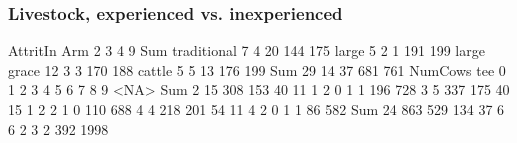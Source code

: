 \subsubsection{Livestock, experienced vs. inexperienced}


\begin{Schunk}
\begin{Soutput}
             AttritIn
Arm             2   3   4   9 Sum
  traditional   7   4  20 144 175
  large         5   2   1 191 199
  large grace  12   3   3 170 188
  cattle        5   5  13 176 199
  Sum          29  14  37 681 761
     NumCows
tee      0    1    2    3    4    5    6    7    8    9 <NA>  Sum
  2     15  308  153   40   11    1    2    0    1    1  196  728
  3      5  337  175   40   15    1    2    2    1    0  110  688
  4      4  218  201   54   11    4    2    0    1    1   86  582
  Sum   24  863  529  134   37    6    6    2    3    2  392 1998
\end{Soutput}
\end{Schunk}





